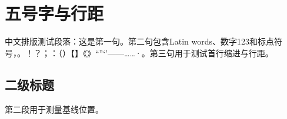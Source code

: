 \documentclass[a4paper,10pt,UTF8,scheme=chinese,zihao=5]{ctexart}
\begin{document}
\section{五号字与行距}
中文排版测试段落：这是第一句。第二句包含Latin words、数字123和标点符号，。！？；：（）【】《》“”‘’——……·。第三句用于测试首行缩进与行距。
\subsection{二级标题}
第二段用于测量基线位置。
\end{document}
